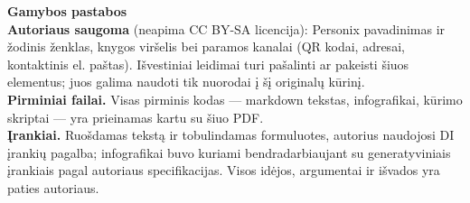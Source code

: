 \clearpage
\thispagestyle{empty}
\begin{flushleft}\small\sffamily
\textbf{Gamybos pastabos}\\[1.2em]

\textbf{Autoriaus saugoma} (neapima CC BY-SA licencija): Personix
pavadinimas ir žodinis ženklas, knygos viršelis bei paramos kanalai (QR
kodai, adresai, kontaktinis el. paštas). Išvestiniai leidimai turi pašalinti ar
pakeisti šiuos elementus; juos galima naudoti tik nuorodai į šį originalų kūrinį.\\[1.2em]

\textbf{Pirminiai failai.} Visas pirminis kodas --- markdown tekstas, infografikai,
kūrimo skriptai --- yra prieinamas kartu su šiuo PDF.\\[1.2em]

\textbf{Įrankiai.} Ruošdamas tekstą ir tobulindamas formuluotes, autorius
naudojosi DI įrankių pagalba; infografikai buvo kuriami bendradarbiaujant su
generatyviniais įrankiais pagal autoriaus specifikacijas.
Visos idėjos, argumentai ir išvados yra paties autoriaus.
\end{flushleft}
\clearpage
